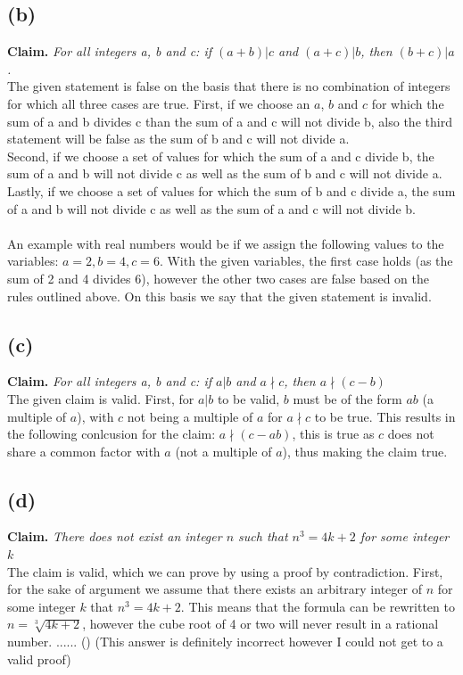 \documentclass[a4paper]{article}
\begin{document}
\subsection{(b)} 
\textbf{Claim.} \textit{For all integers a, b and c: if $(a + b) | c$ and $(a + c)|b$, then $(b + c) | a $.}\\
The given statement is false on the basis that there is no combination of integers for which all three cases are true.
First, if we choose an $a$, $b$ and $c$ for which the sum of a and b divides c than the sum of a and c will not divide b, also the third statement will be false as the sum of b and c will not divide a.\\
Second, if we choose a set of values for which the sum of a and c divide b, the sum of a and b will not divide c as well as the sum of b and c will not divide a.\\
Lastly, if we choose a set of values for which the sum of b and c divide a, the sum of a and b will not divide c as well as the sum of a and c will not divide b.\\
\\
An example with real numbers would be if we assign the following values to the variables: $a = 2, b = 4, c = 6$.
With the given variables, the first case holds (as the sum of 2 and 4 divides 6), however the other two cases are false based on the rules outlined above.
On this basis we say that the given statement is invalid.
\subsection{(c)} 
\textbf{Claim.} \textit{For all integers a, b and c: if $a|b$ and $a \nmid c$, then $a \nmid (c-b)$} \\
The given claim is valid.
First, for $a | b$ to be valid, $b$ must be of the form $ab$ (a multiple of $a$), with $c$ not being a multiple of $a$ for $a \nmid c$ to be true.
This results in the following conlcusion for the claim: $a \nmid (c - ab)$, this is true as $c$ does not share a common factor with $a$ (not a multiple of $a$), thus making the claim true.

\subsection{(d)} 
\textbf{Claim.} \textit{There does not exist an integer $n$ such that $n^3 = 4k + 2$ for some integer $k$} \\
The claim is valid, which we can prove by using a proof by contradiction.
First, for the sake of argument we assume that there exists an arbitrary integer of $n$ for some integer $k$ that $n^3 = 4k + 2$.
This means that the formula can be rewritten to $n = \sqrt[3]{4k +2}$, however the cube root of 4 or two will never result in a rational number.
...... ()
(This answer is definitely incorrect however I could not get to a valid proof)
\end{document}
